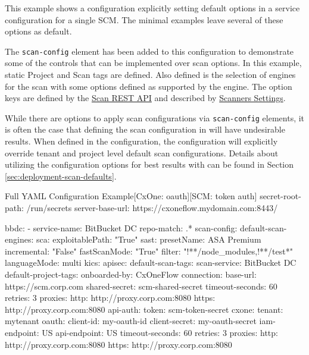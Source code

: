 This example shows a \cxoneflow configuration explicitly setting default options in a service 
configuration for a single SCM.  The minimal examples leave several of these options as default.

The \texttt{scan-config} element has been added to this configuration to
demonstrate some of the controls that can be implemented over scan options.  In this
example, static Project and Scan tags are defined.  Also defined is the selection
of engines for the scan with some options defined as supported by the engine.  The
option keys are defined by the
\href{https://checkmarx.stoplight.io/docs/checkmarx-one-api-reference-guide/branches/main/f601dd9456e80-run-a-scan}{Scan REST API}
and described by
\href{https://checkmarx.com/resource/documents/en/34965-68598-global-settings.html#UUID-8e38f06b-45d4-ea7f-5ff5-50deb22e43aa_UUID-1a4211ec-dbf9-a180-cb20-59e1246ec3fb}{Scanners Settings}.

While there are options to apply scan configurations via \texttt{scan-config} elements, it is often the case that defining the scan configuration
in \cxoneflow will have undesirable results.  When defined in the \cxoneflow configuration, the configuration will explicitly override \cxone
tenant and project level default scan configurations.  Details about utilizing the \cxone configuration options for best results with \cxoneflow
can be found in Section \ref{sec:deployment-scan-defaults}.

\begin{code}{Full YAML Configuration Example}{[CxOne: oauth]}{[SCM: token auth]}
secret-root-path: /run/secrets
server-base-url: https://cxoneflow.mydomain.com:8443/

bbdc:
    - service-name: BitBucket DC
      repo-match: .*
      scan-config:
          default-scan-engines:
              sca:
                  exploitablePath: "True"
              sast:
                  presetName: ASA Premium
                  incremental: "False"
                  fastScanMode: "True"
                  filter: "!**/node_modules,!**/test*"
                  languageMode: multi
              kics:
              apisec:
          default-scan-tags:
              scan-service: BitBucket DC
          default-project-tags:
              onboarded-by: CxOneFlow
      connection:
          base-url: https://scm.corp.com
          shared-secret: scm-shared-secret
          timeout-seconds: 60
          retries: 3
          proxies:
            http: http://proxy.corp.com:8080
            https: http://proxy.corp.com:8080
          api-auth:
              token: scm-token-secret
      cxone:
          tenant: mytenant
          oauth:
              client-id: my-oauth-id
              client-secret: my-oauth-secret
          iam-endpoint: US
          api-endpoint: US
          timeout-seconds: 60
          retries: 3
          proxies:
            http: http://proxy.corp.com:8080
            https: http://proxy.corp.com:8080
\end{code}


